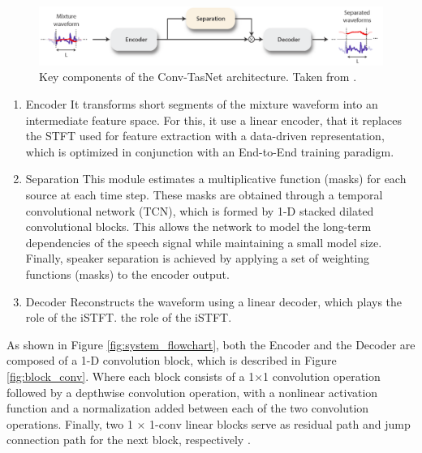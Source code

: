 \documentclass{article}
\begin{document}
\begin{figure}[!h]
    \centering
    \includegraphics[scale=0.38]{Figures/arquitecturas/tasnet_block.png}
    \caption{Key components of the Conv-TasNet architecture. Taken from \cite{luo2019conv}.}
    \label{fig:tasnet_block}
\end{figure}

\begin{enumerate}
    \item Encoder
    It transforms short segments of the mixture waveform into an intermediate feature space. For this, it use a linear encoder, that it replaces the STFT used for feature extraction with a data-driven representation, which is optimized in conjunction with an End-to-End training paradigm.
    
    
    \item Separation
    This module estimates a multiplicative function (masks) for each source at each time step. These masks are obtained through a temporal convolutional network (TCN), which is formed by 1-D stacked dilated convolutional blocks. This allows the network to model the long-term dependencies of the speech signal while maintaining a small model size. Finally, speaker separation is achieved by applying a set of weighting functions (masks) to the encoder output.

    \item Decoder
    Reconstructs the waveform using a linear decoder, which plays the role of the iSTFT. the role of the iSTFT.
    
\end{enumerate}
As shown in Figure \ref{fig:system_flowchart}, both the Encoder and the Decoder are composed of a 1-D convolution block, which is described in Figure \ref{fig:block_conv}. Where each block consists of a 1×1 convolution operation followed by a depthwise convolution operation, with a nonlinear activation function and a normalization added between each of the two convolution operations. Finally, two 1 × 1-conv linear blocks serve as residual path and jump connection path for the next block, respectively \cite{luo2019conv}.
\end{document}
